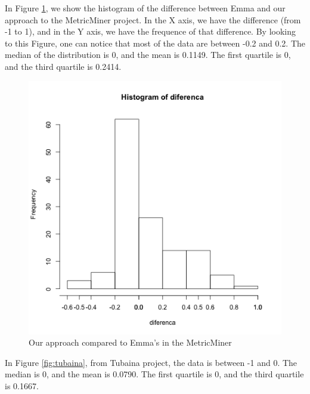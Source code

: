 \documentclass{sig-alternate}
\begin{document}
In Figure \ref{fig:metricminer}, we show the histogram of the difference between Emma and our approach to
the MetricMiner project.
In the X axis, we have the difference (from -1 to 1), and in the Y axis, we have the frequence of that difference.
By looking to this Figure, one can notice that most of the data are between -0.2 and 0.2. 
The median of the distribution is 0, and the mean is 0.1149. The first quartile is 0, and the
third quartile is 0.2414.

\begin{figure}[h!H]
  \centering
  \includegraphics[scale=0.5]{imgs/metricminer-histograma.png}
  \caption{Our approach compared to Emma's in the MetricMiner}
  \label{fig:metricminer}
\end{figure}

In Figure \ref{fig:tubaina}, from Tubaina project, the data is between
-1 and 0. The median is 0, and the mean is 0.0790. The first quartile is
0, and the third quartile is 0.1667.
\end{document}
